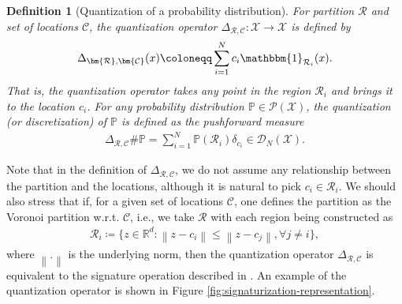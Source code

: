 \documentclass[11pt, a4paper, oneside,reqno]{amsart}
\theoremstyle{plain}
\newtheorem{definition}{Definition}
\def\discMeas{{\mathcal{D}}}
\def\prob{\mathbb{P}}
\def\indicator{{\mathbbm{1}}}
\newcommand{\norm}[1]{\left\lVert#1\right\rVert}
\def\realNum{{\mathbb{R}}}
\def\sP{{\mathcal{P}}}
\def\sR{{\mathcal{R}}}
\def\sX{{\mathcal{X}}}
\def\bsR{{\bm{\mathcal{R}}}}
\def\bsC{{\bm{\mathcal{C}}}}
\begin{document}
\begin{definition}[Quantization of a probability distribution]
    For partition $\bsR$ and set of locations $\bsC $, the quantization operator $\Delta_{\bsR, \bsC} : \sX \rightarrow \sX$ is defined by
    \begin{align}
        \Delta_{\bsR, \bsC}(x) \coloneqq \sum_{i=1}^N c_i \indicator_{\sR_i}(x).
    \end{align}
    That is, the quantization operator takes any point in the region $\sR_i$ and brings it to the location $c_i$. 
    For any probability distribution $\prob \in \sP(\sX)$, the \emph{quantization} (or \emph{discretization}) of $\prob$ is defined as the pushforward measure
    \begin{align}
        \Delta_{\bsR, \bsC} \# \prob = \sum_{i=1}^N \prob(\sR_i) \delta_{c_i} \in \discMeas_N(\sX).
    \end{align}
\end{definition}

Note that in the definition of $  \Delta_{\bsR, \bsC}$, we do not assume any relationship between the partition and the locations, although it is natural to pick $c_i \in \sR_i$. We should also stress that if, for a given set of locations $\bsC$, one defines the partition as the Voronoi partition w.r.t. $\bsC$, i.e., we take $\bsR$ with each region being constructed as
\begin{align}
    \sR_i \coloneqq \Big\{ z \in \realNum^d : \norm{z - c_i} \leq \norm{z - c_j}, \forall j \neq i \Big\},
\end{align}
where $\norm{.}$ is the underlying norm, then the quantization operator $\Delta_{\bsR, \bsC}$ is equivalent to the signature operation described in \cite{adams2024finite}. An example of the quantization operator is shown in Figure \ref{fig:signaturization-representation}. 
\end{document}
